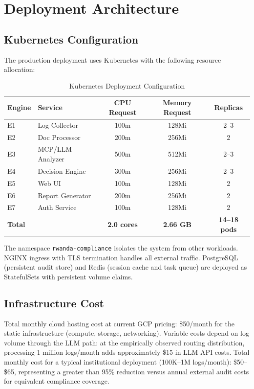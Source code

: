 \documentclass[12pt,oneside]{report}
\begin{document}
\section{Deployment Architecture}

\subsection{Kubernetes Configuration}

The production deployment uses Kubernetes with the following resource allocation:

\begin{table}[H]
\centering
\caption{Kubernetes Deployment Configuration}
\label{tab:k8s_config}
\renewcommand{\arraystretch}{1.3}
\begin{tabular}{|l|l|c|c|c|}
\hline
\textbf{Engine} & \textbf{Service} & \textbf{CPU Request} & \textbf{Memory Request} & \textbf{Replicas} \\
\hline
E1 & Log Collector & 100m & 128Mi & 2--3 \\
E2 & Doc Processor & 200m & 256Mi & 2 \\
E3 & MCP/LLM Analyzer & 500m & 512Mi & 2--3 \\
E4 & Decision Engine & 300m & 256Mi & 2--3 \\
E5 & Web UI & 100m & 128Mi & 2 \\
E6 & Report Generator & 200m & 256Mi & 2 \\
E7 & Auth Service & 100m & 128Mi & 2 \\
\hline
\textbf{Total} & & \textbf{2.0 cores} & \textbf{2.66 GB} & \textbf{14--18 pods} \\
\hline
\end{tabular}
\end{table}

The namespace \texttt{rwanda-compliance} isolates the system from other workloads. NGINX ingress with TLS termination handles all external traffic. PostgreSQL (persistent audit store) and Redis (session cache and task queue) are deployed as StatefulSets with persistent volume claims.

\subsection{Infrastructure Cost}

Total monthly cloud hosting cost at current GCP pricing: \$50/month for the static infrastructure (compute, storage, networking). Variable costs depend on log volume through the LLM path: at the empirically observed routing distribution, processing 1 million logs/month adds approximately \$15 in LLM API costs. Total monthly cost for a typical institutional deployment (100K--1M logs/month): \$50--\$65, representing a greater than 95\% reduction versus annual external audit costs for equivalent compliance coverage.
\end{document}
